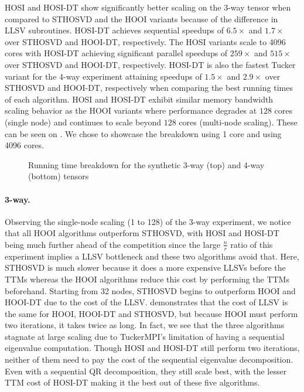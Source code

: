     HOSI and HOSI-DT show significantly better scaling on the 3-way tensor when
    compared to STHOSVD and the HOOI variants because of the difference in LLSV
    subroutines. HOSI-DT achieves sequential speedups of $6.5\times$ and
    $1.7\times$ over STHOSVD and HOOI-DT, respectively. The HOSI variants scale
    to 4096 cores with HOSI-DT achieving significant parallel speedups of
    $259\times$ and $515\times$ over STHOSVD and HOOI-DT, respectively. HOSI-DT
    is also the fastest Tucker variant for the 4-way experiment attaining
    speedups of $1.5\times$ and $2.9\times$ over STHOSVD and HOOI-DT,
    respectively when comparing the best running times of each algorithm. HOSI
    and HOSI-DT exhibit similar memory bandwidth scaling behavior as the HOOI
    variants where performance degrades at $128$ cores (single node) and
    continues to scale beyond $128$ cores (multi-node scaling).
    These can be seen on . We chose to showcase the
    breakdown using 1 core and using 4096 cores.

    \begin{figure}
        \centering
        
        \caption{Running time breakdown for the synthetic 3-way (top) and 4-way (bottom) tensors}
        \label{fig:scaling_breakdown}
    \end{figure}
    
    \paragraph{3-way.} Observing the single-node scaling (1 to 128) of the 3-way
    experiment, we notice that all HOOI algorithms outperform STHOSVD, with
    HOSI and HOSI-DT being much further ahead of the competition since the large
    $\frac{n}{r}$ ratio of this experiment implies a LLSV bottleneck and these
    two algorithms avoid that. Here, STHOSVD is much slower because it does a
    more expensive LLSVs before the TTMs whereas the HOOI algorithms reduce this
    cost by performing the TTMs beforehand. Starting from 32 nodes, STHOSVD
    begins to outperform HOOI and HOOI-DT due to the cost of the LLSV.
     demonstrates that the cost of LLSV is the same
    for HOOI, HOOI-DT and STHOSVD, but because HOOI must perform two
    iterations, it takes twice as long. In fact, we see that the three
    algorithms stagnate at large scaling due to TuckerMPI's limitation of having
    a sequential eigenvalue computation. Though HOSI and HOSI-DT still perform
    two iterations, neither of them need to pay the cost of the sequential
    eigenvalue decomposition. Even with a sequential QR decomposition, they
    still scale best, with the lesser TTM cost of HOSI-DT making it the best out
    of these five algorithms.

